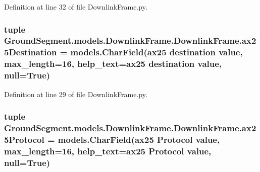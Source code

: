 Definition at line 32 of file Downlink\+Frame.\+py.

\hypertarget{class_ground_segment_1_1models_1_1_downlink_frame_1_1_downlink_frame_a7a8a35f6a299797aed8e0c8f43298a6e}{}
\subsubsection[{ax25\+Destination}]{\setlength{\rightskip}{0pt plus 5cm}tuple Ground\+Segment.\+models.\+Downlink\+Frame.\+Downlink\+Frame.\+ax25\+Destination = models.\+Char\+Field(\textquotesingle{}ax25 destination value\textquotesingle{}, max\+\_\+length=16, help\+\_\+text=\textquotesingle{}ax25 destination value\textquotesingle{}, null=True)\hspace{0.3cm}{\ttfamily [static]}}\label{class_ground_segment_1_1models_1_1_downlink_frame_1_1_downlink_frame_a7a8a35f6a299797aed8e0c8f43298a6e}


Definition at line 29 of file Downlink\+Frame.\+py.

\hypertarget{class_ground_segment_1_1models_1_1_downlink_frame_1_1_downlink_frame_a126f980276460ccacc0d328eab3d1367}{}
\subsubsection[{ax25\+Protocol}]{\setlength{\rightskip}{0pt plus 5cm}tuple Ground\+Segment.\+models.\+Downlink\+Frame.\+Downlink\+Frame.\+ax25\+Protocol = models.\+Char\+Field(\textquotesingle{}ax25 Protocol value\textquotesingle{}, max\+\_\+length=16, help\+\_\+text=\textquotesingle{}ax25 Protocol value\textquotesingle{}, null=True)\hspace{0.3cm}{\ttfamily [static]}}\label{class_ground_segment_1_1models_1_1_downlink_frame_1_1_downlink_frame_a126f980276460ccacc0d328eab3d1367}


